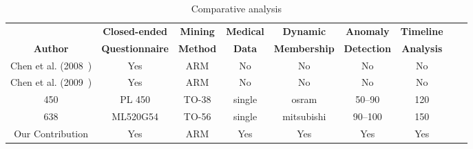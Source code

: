 \begin{landscape}
    \begin{table}[htbp]
        \caption{Comparative analysis}
        \label{tab:TBL_Comparative_Analisys}
        \centering
        \small
        \setlength\tabcolsep{2pt}
        \begin{tabular}{|c|c|c|c|c|c|c|c|c|}
            \hline
                                                     & \textbf{Closed-ended}  & \textbf{Mining} & \textbf{Medical} & \textbf{Dynamic}    & \textbf{Anomaly}   & \textbf{Timeline} \\
            \textbf{Author}                          & \textbf{Questionnaire} & \textbf{Method} & \textbf{Data}    & \textbf{Membership} & \textbf{Detection} & \textbf{Analysis} \\
            \hline
            Chen et al. (2008~\cite{chen2008mining}) & Yes                    & ARM             & No               & No                  & No                 & No                \\
            \hline
            Chen et al. (2009~\cite{chen2009mining}) & Yes                    & ARM             & No               & No                  & No                 & No                \\
            \hline
            450                                      & PL 450                 & TO-38           & single           & osram               & 50--90             & 120               \\
            \hline
            638                                      & ML520G54               & TO-56           & single           & mitsubishi          & 90--100            & 150               \\
            \hline
            Our Contribution                         & Yes                    & ARM             & Yes              & Yes                 & Yes                & Yes               \\
            \hline
        \end{tabular}
    \end{table}
\end{landscape}
